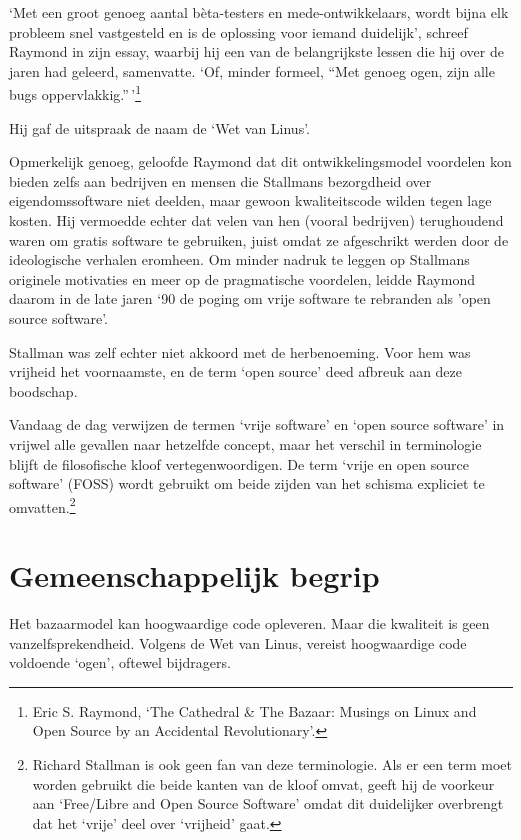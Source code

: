 \documentclass[
  a5paper,
  smalldemyvopaper,11pt,twoside,onecolumn,openright,extrafontsizes]{memoir}
\begin{document}
`Met een groot genoeg aantal bèta-testers en mede-ontwikkelaars, wordt
bijna elk probleem snel vastgesteld en is de oplossing voor iemand
duidelijk', schreef Raymond in zijn essay, waarbij hij een van de
belangrijkste lessen die hij over de jaren had geleerd, samenvatte. `Of,
minder formeel, ``Met genoeg ogen, zijn alle bugs
oppervlakkig.''\,'\footnote{\hspace{0pt}Eric S. Raymond, `The Cathedral
  \& The Bazaar: Musings on Linux and Open Source by an Accidental
  Revolutionary'.}

Hij gaf de uitspraak de naam de `Wet van Linus'.

Opmerkelijk genoeg, geloofde Raymond dat dit ontwikkelingsmodel
voordelen kon bieden zelfs aan bedrijven en mensen die Stallmans
bezorgdheid over eigendomssoftware niet deelden, maar gewoon
kwaliteitscode wilden tegen lage kosten. Hij vermoedde echter dat velen
van hen (vooral bedrijven) terughoudend waren om gratis software te
gebruiken, juist omdat ze afgeschrikt werden door de ideologische
verhalen eromheen. Om minder nadruk te leggen op Stallmans originele
motivaties en meer op de pragmatische voordelen, leidde Raymond daarom
in de late jaren `90 de poging om vrije software te rebranden als 'open
source software'.

Stallman was zelf echter niet akkoord met de herbenoeming. Voor hem was
vrijheid het voornaamste, en de term `open source' deed afbreuk aan deze
boodschap.

Vandaag de dag verwijzen de termen `vrije software' en `open source
software' in vrijwel alle gevallen naar hetzelfde concept, maar het
verschil in terminologie blijft de filosofische kloof vertegenwoordigen.
De term `vrije en open source software' (FOSS) wordt gebruikt om beide
zijden van het schisma expliciet te omvatten.\footnote{Richard Stallman
  is ook geen fan van deze terminologie. Als er een term moet worden
  gebruikt die beide kanten van de kloof omvat, geeft hij de voorkeur
  aan `Free/Libre and Open Source Software' omdat dit duidelijker
  overbrengt dat het `vrije' deel over `vrijheid' gaat.}

\section{Gemeenschappelijk begrip}\label{gemeenschappelijk-begrip}

Het bazaarmodel kan hoogwaardige code opleveren. Maar die kwaliteit is
geen vanzelfsprekendheid. Volgens de Wet van Linus, vereist hoogwaardige
code voldoende `ogen', oftewel bijdragers.
\end{document}
